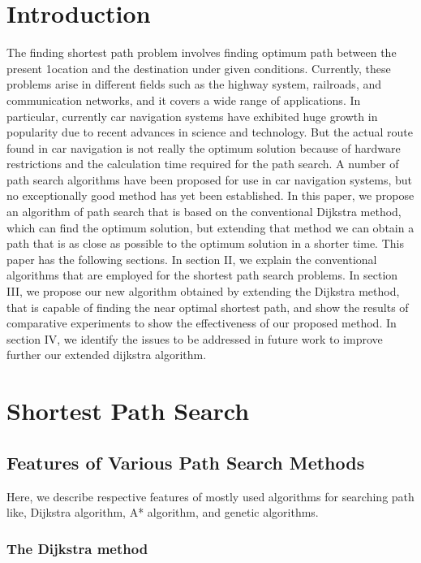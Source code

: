 \documentclass[conference]{IEEEtran}
\begin{document}
\section{Introduction}
The finding shortest path problem involves finding optimum
path between the present 1ocation and the destination under given conditions. Currently, these problems arise in different fields such as the highway system,
railroads, and communication networks, and it covers a
wide range of applications. In particular, currently car navigation systems have exhibited huge growth in popularity due to recent advances in science and technology. But the actual route found in car navigation is not
really the optimum solution because of hardware
restrictions and the calculation time required for the
path search. A number of path search algorithms have
been proposed for use in car navigation systems, but
no exceptionally good method has yet
been established. In this paper, we propose an algorithm
of path search that is based on the conventional Dijkstra method,
which can find the optimum solution, but extending
that method we can obtain a path that is as close as
possible to the optimum solution in a shorter time.
This paper has the following sections.
In section II, we explain the conventional algorithms that
are employed for the shortest path search problems.
In section III, we propose our new algorithm obtained by
extending the Dijkstra method, that is capable of
finding the near optimal shortest path, and show the results of
comparative experiments to show the effectiveness
of our proposed method.
In section IV, we identify the issues to be addressed in future work to improve further our extended dijkstra
algorithm. 

\section{Shortest Path Search}

\subsection{Features of Various Path Search Methods}

Here, we describe respective features of mostly used algorithms for searching path like, Dijkstra algorithm, A* algorithm, and genetic algorithms.

\subsubsection{The Dijkstra method}
\end{document}
